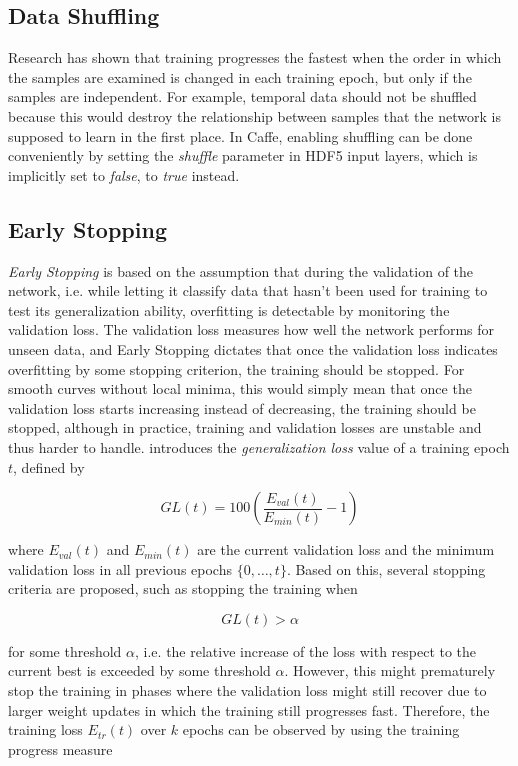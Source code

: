 	\subsection{Data Shuffling}
Research \cite{shuffling, lecun_norm} has shown that training progresses the fastest when the order in which the samples are examined is changed in each training epoch, but only if the samples are independent. For example, temporal data should not be shuffled because this would destroy the relationship between samples that the network is supposed to learn in the first place. In Caffe, enabling shuffling can be done conveniently by setting the \textit{shuffle} parameter in HDF5 input layers, which is implicitly set to \textit{false}, to \textit{true} instead.


	\subsection{Early Stopping}
\textit{Early Stopping} is based on the assumption that during the validation of the network, i.e. while letting it classify data that hasn't been used for training to test its generalization ability, overfitting is detectable by monitoring the validation loss. The validation loss measures how well the network performs for unseen data, and Early Stopping dictates that once the validation loss indicates overfitting by some stopping criterion, the training should be stopped. For smooth curves without local minima, this would simply mean that once the validation loss starts increasing instead of decreasing, the training should be stopped, although in practice, training and validation losses are unstable and thus harder to handle. \cite{early_stopping} introduces the \textit{generalization loss} value of a training epoch $t$, defined by

\[ GL(t) = 100 \left ( \frac{E_{val}(t)}{E_{min}(t)} - 1 \right ) \]

\noindent where $E_{val}(t)$ and $E_{min}(t)$ are the current validation loss and the minimum validation loss in all previous epochs $\{0, \dots, t\}$. Based on this, several stopping criteria are proposed, such as stopping the training when 

\[ GL(t) > \alpha \]

\noindent for some threshold $\alpha$, i.e. the relative increase of the loss with respect to the current best is exceeded by some threshold $\alpha$. However, this might prematurely stop the training in phases where the validation loss might still recover due to larger weight updates in which the training still progresses fast. Therefore, the training loss $E_{tr}(t)$ over $k$ epochs can be observed by using the training progress measure

